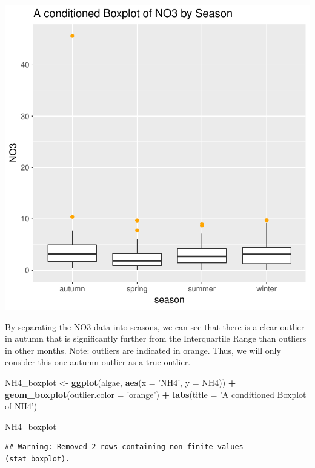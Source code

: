 \documentclass[]{article}
\newenvironment{Shaded}{\begin{snugshade}}{\end{snugshade}}
\newcommand{\KeywordTok}[1]{\textcolor[rgb]{0.13,0.29,0.53}{\textbf{#1}}}
\newcommand{\DataTypeTok}[1]{\textcolor[rgb]{0.13,0.29,0.53}{#1}}
\newcommand{\StringTok}[1]{\textcolor[rgb]{0.31,0.60,0.02}{#1}}
\newcommand{\OperatorTok}[1]{\textcolor[rgb]{0.81,0.36,0.00}{\textbf{#1}}}
\newcommand{\NormalTok}[1]{#1}
\begin{document}
\begin{center}\includegraphics{homework1-handout_files/figure-latex/unnamed-chunk-2-2} \end{center}

By separating the NO3 data into seasons, we can see that there is a
clear outlier in autumn that is significantly further from the
Interquartile Range than outliers in other months. Note: outliers are
indicated in orange. Thus, we will only consider this one autumn outlier
as a true outlier.

\begin{Shaded}
\begin{Highlighting}[]
\NormalTok{NH4_boxplot <-}\StringTok{ }\KeywordTok{ggplot}\NormalTok{(algae, }\KeywordTok{aes}\NormalTok{(}\DataTypeTok{x =} \StringTok{'NH4'}\NormalTok{, }\DataTypeTok{y =}\NormalTok{ NH4)) }\OperatorTok{+}\StringTok{ }
\StringTok{  }\KeywordTok{geom_boxplot}\NormalTok{(}\DataTypeTok{outlier.color =} \StringTok{'orange'}\NormalTok{) }\OperatorTok{+}
\StringTok{  }\KeywordTok{labs}\NormalTok{(}\DataTypeTok{title =} \StringTok{'A conditioned Boxplot of NH4'}\NormalTok{)}

\NormalTok{NH4_boxplot }
\end{Highlighting}
\end{Shaded}

\begin{verbatim}
## Warning: Removed 2 rows containing non-finite values (stat_boxplot).
\end{verbatim}
\end{document}
